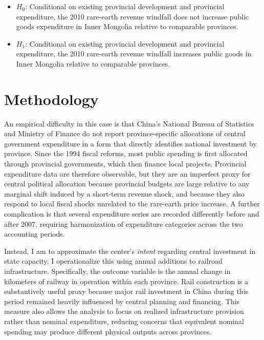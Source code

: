 \documentclass[12pt]{article}
\begin{document}
\begin{itemize}
    \item $H_0$: Conditional on existing provincial development and provincial expenditure, the 2010 rare-earth revenue windfall does not increase public goods expenditure in Inner Mongolia relative to comparable provinces.

    \item $H_1$: Conditional on existing provincial development and provincial expenditure, the 2010 rare-earth revenue windfall increases public goods in Inner Mongolia relative to comparable provinces.
\end{itemize}

\section{Methodology}

An empirical difficulty in this case is that China's National Bureau of Statistics and Ministry of Finance do not report province-specific allocations of central government expenditure in a form that directly identifies national investment by province. Since the 1994 fiscal reforms, most public spending is first allocated through provincial governments, which then finance local projects. Provincial expenditure data are therefore observable, but they are an imperfect proxy for central political allocation because provincial budgets are large relative to any marginal shift induced by a short-term revenue shock, and because they also respond to local fiscal shocks unrelated to the rare-earth price increase. A further complication is that several expenditure series are recorded differently before and after 2007, requiring harmonization of expenditure categories across the two accounting periods.

Instead, I am to approximate the center's \textit{intent} regarding central investment in state capacity. I operationalize this using annual additions to railroad infrastructure. Specifically, the outcome variable is the annual change in kilometers of railway in operation within each province. Rail construction is a substantively useful proxy because major rail investment in China during this period remained heavily influenced by central planning and financing. This measure also allows the analysis to focus on realized infrastructure provision rather than nominal expenditure, reducing concerns that equivalent nominal spending may produce different physical outputs across provinces.
\end{document}
